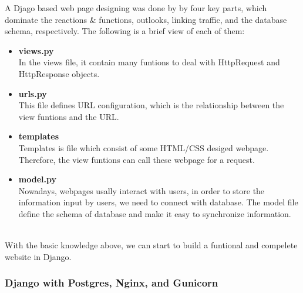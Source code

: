 A Djago based web page designing was done by by four key parts, which dominate the reactions \& functions, outlooks, linking traffic, and the database schema, respectively. The following is a brief view of each of them:
\begin{itemize}
		\item[] \textbf{views.py}\\
			  In the views file, it contain many funtions to deal with HttpRequest and  HttpResponse objects.
		\item[] \textbf{urls.py}\\
			  This file defines URL configuration, which is the relationship between the view funtions and the URL.
		\item[] \textbf{templates}\\
			  Templates is file which consist of some HTML/CSS desiged webpage. Therefore, the view funtions can call these webpage for a request.
		\item[] \textbf{model.py}\\
			  Nowadays, webpages usally interact with users, in order to store the information input by users, we need to connect with database. The model file define the schema of database and make it easy to synchronize information.\\\\
\end{itemize}
With the basic knowledge above, we can start to build a funtional and compelete website in Django.

\subsubsection{Django with Postgres, Nginx, and Gunicorn}
